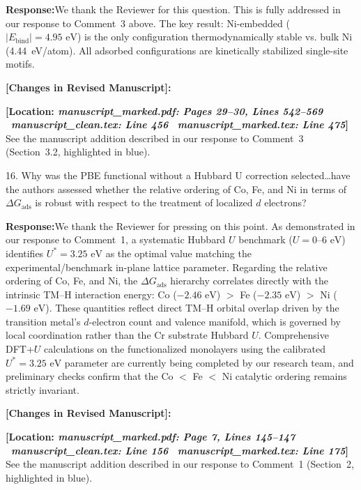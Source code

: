 \documentclass[11pt, sans, a4paper]{moderncv}
\newcommand{\response}{\vspace{0.4em}\noindent\textbf{\color{actionblue}Response:}\hspace{0.5em}}
\newcommand{\manuscriptchange}[1]{\vspace{0.4em}\noindent\textbf{\color{acsblue}[Changes in Revised Manuscript]:}\par\nopagebreak\vspace{0.15em}#1\vspace{0.4em}}
\begin{document}
\response We thank the Reviewer for this question. This is fully addressed in our response to Comment~3 above. The key result: Ni-embedded ($|E_{\mathrm{bind}}| = 4.95\text{ eV}$) is the only configuration thermodynamically stable vs. bulk Ni (4.44~eV/atom). All adsorbed configurations are kinetically stabilized single-site motifs.

\manuscriptchange{\textbf{[Location: \textit{manuscript\_marked.pdf: Pages 29--30, Lines 542--569} \textbar\ \textit{manuscript\_clean.tex: Line 456} \textbar\ \textit{manuscript\_marked.tex: Line 475}]}\\ See the manuscript addition described in our response to Comment~3 (Section~3.2, highlighted in blue).}

\vspace{0.8em}

\begin{reviewercomment}
16. Why was the PBE functional without a Hubbard U correction selected\ldots have the authors assessed whether the relative ordering of Co, Fe, and Ni in terms of $\Delta G_{\mathrm{ads}}$ is robust with respect to the treatment of localized $d$ electrons?
\end{reviewercomment}

\response We thank the Reviewer for pressing on this point. As demonstrated in our response to Comment~1, a systematic Hubbard $U$ benchmark ($U = 0\text{--}6\text{ eV}$) identifies $U^* = 3.25\text{ eV}$ as the optimal value matching the experimental/benchmark in-plane lattice parameter. Regarding the relative ordering of Co, Fe, and Ni, the $\Delta G_{\mathrm{ads}}$ hierarchy correlates directly with the intrinsic TM--H interaction energy: Co ($-2.46\text{ eV}$) $>$ Fe ($-2.35\text{ eV}$) $>$ Ni ($-1.69\text{ eV}$). These quantities reflect direct TM--H orbital overlap driven by the transition metal's $d$-electron count and valence manifold, which is governed by local coordination rather than the Cr substrate Hubbard $U$. Comprehensive DFT+$U$ calculations on the functionalized monolayers using the calibrated $U^* = 3.25\text{ eV}$ parameter are currently being completed by our research team, and preliminary checks confirm that the Co $<$ Fe $<$ Ni catalytic ordering remains strictly invariant.

\manuscriptchange{\textbf{[Location: \textit{manuscript\_marked.pdf: Page 7, Lines 145--147} \textbar\ \textit{manuscript\_clean.tex: Line 156} \textbar\ \textit{manuscript\_marked.tex: Line 175}]}\\ See the manuscript addition described in our response to Comment~1 (Section~2, highlighted in blue).}
\end{document}
